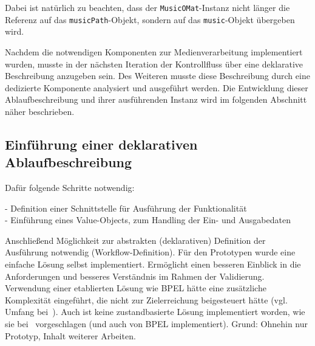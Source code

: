   Dabei ist natürlich zu beachten, dass der \verb!MusicOMat!-Instanz nicht länger die Referenz auf das \verb!musicPath!-Objekt, sondern auf das \verb!music!-Objekt übergeben wird.
  
  Nachdem die notwendigen Komponenten zur Medienverarbeitung implementiert wurden, musste in der nächsten Iteration der Kontrollfluss über eine deklarative Beschreibung anzugeben sein. Des Weiteren musste diese Beschreibung durch eine dedizierte Komponente analysiert und ausgeführt werden. Die Entwicklung dieser Ablaufbeschreibung und ihrer ausführenden Instanz wird im folgenden Abschnitt näher beschrieben.
  
  
\subsection{Einführung einer deklarativen Ablaufbeschreibung} %
\label{sub:einfuehrung_einer_deklarativen_ablaufbeschreibung}

  Dafür folgende Schritte notwendig:
 
 - Definition einer Schnittstelle für Ausführung der Funktionalität\\
 - Einführung eines Value-Objects, zum Handling der Ein- und Ausgabedaten
 
  Anschließend Möglichkeit zur abstrakten (deklarativen) Definition der Ausführung notwendig (Workflow-Definition). Für den Prototypen wurde eine einfache Lösung selbst implementiert. Ermöglicht einen besseren Einblick in die Anforderungen und besseres Verständnis im Rahmen der Validierung. Verwendung einer etablierten Lösung wie BPEL hätte eine zusätzliche Komplexität eingeführt, die nicht zur Zielerreichung beigesteuert hätte (vgl. Umfang bei~\citep{samma08}). Auch ist keine zustandbasierte Lösung implementiert worden, wie sie bei~\citep{biornstad2006cfs} vorgeschlagen (und auch von BPEL implementiert). Grund: Ohnehin nur Prototyp, Inhalt weiterer Arbeiten.
  



  
